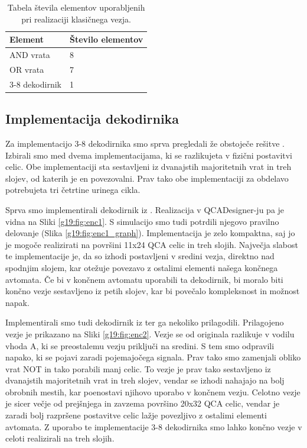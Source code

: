 \begin{table}
    \centering
    \begin{tabular}{|l|l|}
        \hline
        \textbf{Element} & \textbf{Število elementov} \\ \hline
        AND vrata        & 8                          \\ \hline
        OR vrata         & 7                          \\ \hline
        3-8 dekodirnik   & 1                          \\ \hline
    \end{tabular}
    \caption{Tabela števila elementov uporabljenih pri realizaciji klasičnega vezja.}
\end{table}

\subsection{Implementacija dekodirnika}

Za implementacijo 3-8 dekodirnika smo sprva pregledali že obstoječe rešitve \cite{3_8decoder_1, 3_8decoder_2}.
Izbirali smo med dvema implementacijama, ki se razlikujeta v fizični postavitvi celic.
Obe implementaciji sta sestavljeni iz dvanajstih majoritetnih vrat in treh slojev, od katerih je en povezovalni.
Prav tako obe implementaciji za obdelavo potrebujeta tri četrtine urinega cikla.

Sprva smo implementirali dekodirnik iz \cite{3_8decoder_2}.
Realizacija v QCADesigner-ju pa je vidna na Sliki \ref{g19:fig:enc1}.
S simulacijo smo tudi potrdili njegovo pravilno delovanje (Slika \ref{g19:fig:enc1_graph}).
Implementacija je zelo kompaktna, saj jo je mogoče realizirati na površini 11x24 QCA celic in treh slojih.
Največja slabost te implementacije je, da so izhodi postavljeni v sredini vezja, direktno nad spodnjim slojem, kar otežuje povezavo z ostalimi elementi našega končnega avtomata.
Če bi v končnem avtomatu uporabili ta dekodirnik, bi moralo biti končno vezje sestavljeno iz petih slojev, kar bi povečalo kompleksnost in možnost napak.

Implementirali smo tudi dekodirnik iz \cite{3_8decoder_1} ter ga nekoliko prilagodili.
Prilagojeno vezje je prikazano na Sliki \ref{g19:fig:enc2}.
Vezje se od originala razlikuje v vodilu vhoda A, ki se preostalemu vezju priključi na sredini.
S tem smo odpravili napako, ki se pojavi zaradi pojemajočega signala.
Prav tako smo zamenjali obliko vrat NOT in tako porabili manj celic.
To vezje je prav tako sestavljeno iz dvanajstih majoritetnih vrat in treh slojev, vendar se izhodi nahajajo na bolj obrobnih mestih, kar poenostavi njihovo uporabo v končnem vezju.
Celotno vezje je sicer večje od prejšnjega in zavzema površino 20x32 QCA celic, vendar je zaradi bolj razpršene postavitve celic lažje povezljivo z ostalimi elementi avtomata.
Z uporabo te implementacije 3-8 dekodirnika smo lahko končno vezje v celoti realizirali na treh slojih.

